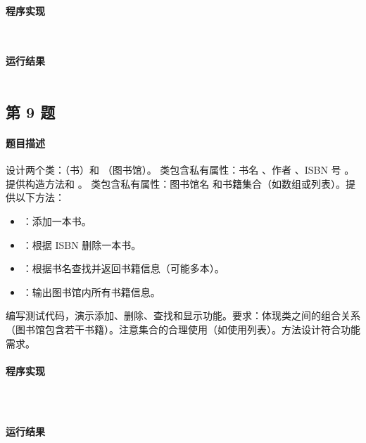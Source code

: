 \documentclass{academics}
\begin{document}
\paragraph{程序实现} {
    \inputminted[label=Employee.java]{java}{../src/P08/Employee.java}
    \inputminted[label=Main.java]{java}{../src/P08/Main.java}
}

\paragraph{运行结果} {
    \inputminted{text}{../res/P08.out}
}

\subsection{第 9 题}

\paragraph{题目描述} {
    设计两个类：（书）和 （图书馆）。 类包含私有属性：书名 、作者 、ISBN 号 。提供构造方法和 。 类包含私有属性：图书馆名  和书籍集合（如数组或列表）。提供以下方法：
    \begin{itemize}
        \item {}：添加一本书。
        \item {}：根据 ISBN 删除一本书。
        \item {}：根据书名查找并返回书籍信息（可能多本）。
        \item {}：输出图书馆内所有书籍信息。
    \end{itemize}
    编写测试代码，演示添加、删除、查找和显示功能。要求：体现类之间的组合关系（图书馆包含若干书籍）。注意集合的合理使用（如使用列表）。方法设计符合功能需求。
}

\paragraph{程序实现} {
    \inputminted[label=Book.java]{java}{../src/P09/Book.java}
    \inputminted[label=Library.java]{java}{../src/P09/Library.java}
    \inputminted[label=Main.java]{java}{../src/P09/Main.java}
}

\paragraph{运行结果} {
    \inputminted{text}{../res/P09.out}
}
\end{document}

